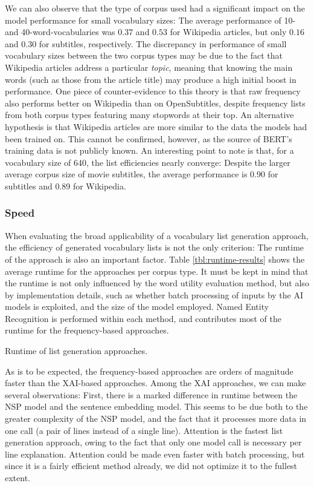 We can also observe that the type of corpus used had a significant impact on the model performance for small vocabulary sizes:
The average performance of 10- and 40-word-vocabularies was $0.37$ and $0.53$ for Wikipedia articles, but only $0.16$ and $0.30$ for subtitles, respectively.
The discrepancy in performance of small vocabulary sizes between the two corpus types may be due to the fact that Wikipedia articles address a particular \textit{topic}, meaning that knowing the main words (such as those from the article title) may produce a high initial boost in performance.
One piece of counter-evidence to this theory is that raw frequency also performs better on Wikipedia than on OpenSubtitles, despite frequency lists from both corpus types featuring many stopwords at their top.
An alternative hypothesis is that Wikipedia articles are more similar to the data the models had been trained on.
This cannot be confirmed, however, as the source of BERT's training data is not publicly known.
An interesting point to note is that, for a vocabulary size of 640, the list efficiencies nearly converge:
Despite the larger average corpus size of movie subtitles, the average performance is 0.90 for subtitles and 0.89 for Wikipedia.

\subsubsection{Speed} \label{sec:eval-speed}
When evaluating the broad applicability of a vocabulary list generation approach, the efficiency of generated vocabulary lists is not the only criterion:
The runtime of the approach is also an important factor.
Table \ref{tbl:runtime-results} shows the average runtime for the approaches per corpus type.
It must be kept in mind that the runtime is not only influenced by the word utility evaluation method, but also by implementation details, such as whether batch processing of inputs by the AI models is exploited, and the size of the model employed.
Named Entity Recognition is performed within each method, and contributes most of the runtime for the frequency-based approaches.

\begin{table}[ht]
	\centering
	
	\caption{Runtime of list generation approaches.}
	\label{tbl:runtime-results}
\end{table}

As is to be expected, the frequency-based approaches are orders of magnitude faster than the XAI-based approaches.
Among the XAI approaches, we can make several observations:
First, there is a marked difference in runtime between the NSP model and the sentence embedding model.
This seems to be due both to the greater complexity of the NSP model, and the fact that it processes more data in one call (a pair of lines instead of a single line).
Attention is the fastest list generation approach, owing to the fact that only one model call is necessary per line explanation.
Attention could be made even faster with batch processing, but since it is a fairly efficient method already, we did not optimize it to the fullest extent.

